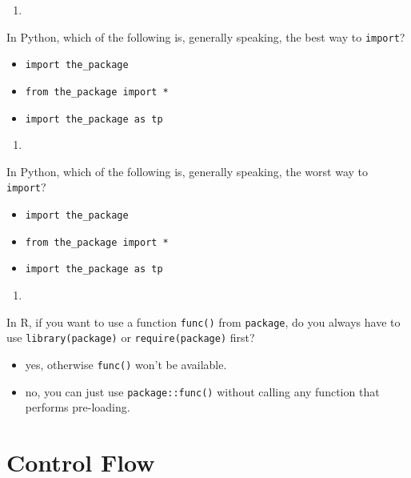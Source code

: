\documentclass[12pt,krantz2]{krantz}
\providecommand{\tightlist}{%
  \setlength{\itemsep}{0pt}\setlength{\parskip}{0pt}}
\begin{document}
\begin{enumerate}
\def\labelenumi{\arabic{enumi}.}
\setcounter{enumi}{2}
\item
\end{enumerate}

In Python, which of the following is, generally speaking, the best way to \texttt{import}?

\begin{itemize}
\tightlist
\item
  \texttt{import\ the\_package}
\item
  \texttt{from\ the\_package\ import\ *}
\item
  \texttt{import\ the\_package\ as\ tp}
\end{itemize}

\begin{enumerate}
\def\labelenumi{\arabic{enumi}.}
\setcounter{enumi}{3}
\item
\end{enumerate}

In Python, which of the following is, generally speaking, the worst way to \texttt{import}?

\begin{itemize}
\tightlist
\item
  \texttt{import\ the\_package}
\item
  \texttt{from\ the\_package\ import\ *}
\item
  \texttt{import\ the\_package\ as\ tp}
\end{itemize}

\begin{enumerate}
\def\labelenumi{\arabic{enumi}.}
\setcounter{enumi}{4}
\item
\end{enumerate}

In R, if you want to use a function \texttt{func()} from \texttt{package}, do you always have to use \texttt{library(package)} or \texttt{require(package)} first?

\begin{itemize}
\tightlist
\item
  yes, otherwise \texttt{func()} won't be available.
\item
  no, you can just use \texttt{package::func()} without calling any function that performs pre-loading.
\end{itemize}

\hypertarget{control-flow}{%
\chapter{Control Flow}\label{control-flow}}
\end{document}
